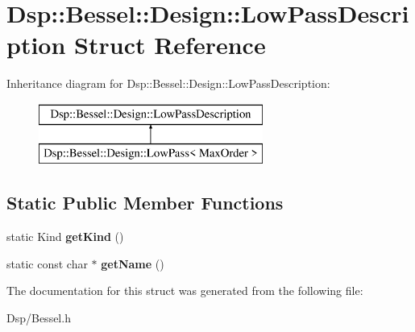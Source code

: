 \hypertarget{structDsp_1_1Bessel_1_1Design_1_1LowPassDescription}{\section{Dsp\-:\-:Bessel\-:\-:Design\-:\-:Low\-Pass\-Description Struct Reference}
\label{structDsp_1_1Bessel_1_1Design_1_1LowPassDescription}
}
Inheritance diagram for Dsp\-:\-:Bessel\-:\-:Design\-:\-:Low\-Pass\-Description\-:\begin{figure}[H]
\begin{center}
\leavevmode
\includegraphics[height=2.000000cm]{structDsp_1_1Bessel_1_1Design_1_1LowPassDescription}
\end{center}
\end{figure}
\subsection*{Static Public Member Functions}
\begin{DoxyCompactItemize}
\item 
\hypertarget{structDsp_1_1Bessel_1_1Design_1_1LowPassDescription_ac72996de9fd77d9352472faa3db00a57}{static Kind {\bfseries get\-Kind} ()}\label{structDsp_1_1Bessel_1_1Design_1_1LowPassDescription_ac72996de9fd77d9352472faa3db00a57}

\item 
\hypertarget{structDsp_1_1Bessel_1_1Design_1_1LowPassDescription_a86aaf76db3ff89e23e589a75f23f5de2}{static const char $\ast$ {\bfseries get\-Name} ()}\label{structDsp_1_1Bessel_1_1Design_1_1LowPassDescription_a86aaf76db3ff89e23e589a75f23f5de2}

\end{DoxyCompactItemize}


The documentation for this struct was generated from the following file\-:\begin{DoxyCompactItemize}
\item 
Dsp/Bessel.\-h\end{DoxyCompactItemize}
